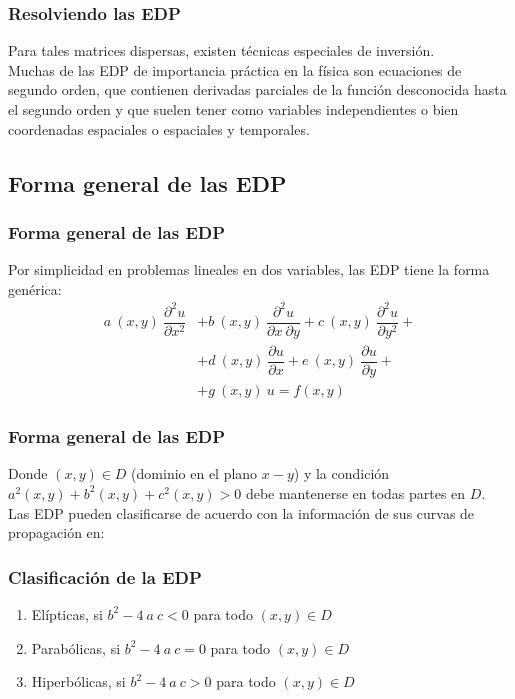 \documentclass[12pt]{beamer}
\begin{document}
\begin{frame}
\frametitle{Resolviendo las EDP}
Para tales matrices dispersas, existen técnicas especiales de inversión.
\\
\bigskip
Muchas de las EDP de importancia práctica en la física son ecuaciones de segundo orden, que contienen derivadas parciales de la función desconocida hasta el segundo orden y que suelen tener como variables independientes o bien coordenadas espaciales o espaciales y temporales.
\end{frame}
\subsection{Forma general de las EDP}
\begin{frame}
\frametitle{Forma general de las EDP}
Por simplicidad en problemas lineales en dos variables, las EDP tiene la forma genérica:
\[ \begin{split}  a \: (x,y) \: \dfrac{\partial^{2} u}{\partial x^{2}} &+ b \: (x,y) \: \dfrac{\partial^{2} u}{\partial x \: \partial y} + c \: (x,y) \: \dfrac{\partial^{2} u}{\partial y^{2}} + \\
&+ d \: (x,y) \: \dfrac{\partial u}{\partial x} + e \: (x,y) \: \dfrac{\partial u}{\partial y} + \\
&+ g \: (x,y) \: u = f(x,y) \end{split} \]
\end{frame}
\begin{frame}
\frametitle{Forma general de las EDP}
Donde $(x, y) \in D$ (dominio en el plano $x-y$) y la condición $a^{2} (x, y) + b^{2} (x, y) + c^{2} (x, y)> 0$ debe mantenerse en todas partes en $D$.
\\
\bigskip
Las EDP pueden clasificarse de acuerdo con la información de sus curvas de propagación en:
\end{frame}
\begin{frame}
\frametitle{Clasificación de la EDP}
\begin{enumerate}[<+->]
\item Elípticas, si $b^{2} - 4 \: a\: c < 0$ para todo $(x,y) \in D$
\item Parabólicas, si $b^{2} - 4 \: a \: c = 0$ para todo $(x,y) \in D$
\item Hiperbólicas, si $b^{2} - 4 \: a \: c > 0$ para todo $(x,y) \in D$
\end{enumerate}
\end{frame}
\end{document}
